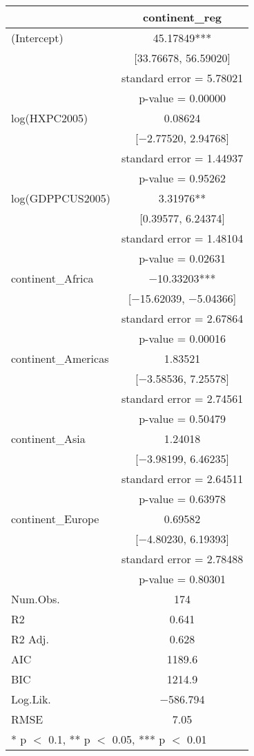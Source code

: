 \documentclass[
]{article}
\begin{document}
\begin{table}
\centering
\begin{tabular}[t]{lc}
\toprule
  & continent\_reg\\
\midrule
(Intercept) & \num{45.17849}***\\
 & {}[\num{33.76678}, \num{56.59020}]\\
 & standard error = \num{5.78021}\\
 & p-value = \num{0.00000}\\
log(HXPC2005) & \num{0.08624}\\
 & {}[\num{-2.77520}, \num{2.94768}]\\
 & standard error = \num{1.44937}\\
 & p-value = \num{0.95262}\\
log(GDPPCUS2005) & \num{3.31976}**\\
 & {}[\num{0.39577}, \num{6.24374}]\\
 & standard error = \num{1.48104}\\
 & p-value = \num{0.02631}\\
continent\_Africa & \num{-10.33203}***\\
 & {}[\num{-15.62039}, \num{-5.04366}]\\
 & standard error = \num{2.67864}\\
 & p-value = \num{0.00016}\\
continent\_Americas & \num{1.83521}\\
 & {}[\num{-3.58536}, \num{7.25578}]\\
 & standard error = \num{2.74561}\\
 & p-value = \num{0.50479}\\
continent\_Asia & \num{1.24018}\\
 & {}[\num{-3.98199}, \num{6.46235}]\\
 & standard error = \num{2.64511}\\
 & p-value = \num{0.63978}\\
continent\_Europe & \num{0.69582}\\
 & {}[\num{-4.80230}, \num{6.19393}]\\
 & standard error = \num{2.78488}\\
 & p-value = \num{0.80301}\\
\midrule
Num.Obs. & \num{174}\\
R2 & \num{0.641}\\
R2 Adj. & \num{0.628}\\
AIC & \num{1189.6}\\
BIC & \num{1214.9}\\
Log.Lik. & \num{-586.794}\\
RMSE & \num{7.05}\\
\bottomrule
\multicolumn{2}{l}{\rule{0pt}{1em}* p $<$ 0.1, ** p $<$ 0.05, *** p $<$ 0.01}\\
\end{tabular}
\end{table}
\end{document}
